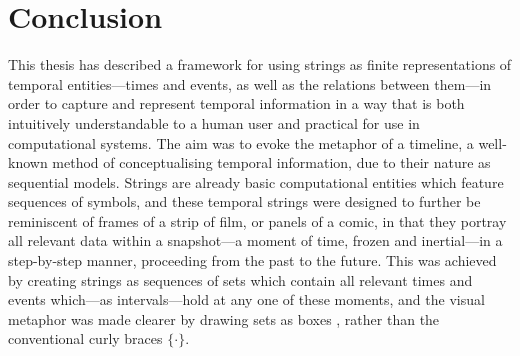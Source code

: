 \documentclass[a4paper,12pt,leqno,twoside]{article}
\newcommand{\vph}[1]{\vphantom{#1}}
\newcommand{\ebox}[1]{\fbox{$\vph{'(),}#1$}}
\begin{document}
\section{Conclusion}\label{sec:conclusion}
% 
% 
% 
% 
% 
This thesis has described a framework for using strings as finite representations of temporal entities---times and events, as well as the relations between them---in order to capture and represent temporal information in a way that is both intuitively understandable to a human user and practical for use in computational systems. The aim was to evoke the metaphor of a timeline, a well-known method of conceptualising temporal information, due to their nature as sequential models. Strings are already basic computational entities which feature sequences of symbols, and these temporal strings were designed to further be reminiscent of frames of a strip of film, or panels of a comic, in that they portray all relevant data within a snapshot---a moment of time, frozen and inertial---in a step-by-step manner, proceeding from the past to the future. This was achieved by creating strings as sequences of sets which contain all relevant times and events which---as intervals---hold at any one of these moments, and the visual metaphor was made clearer by drawing sets as boxes \ebox{\cdot}, rather than the conventional curly braces $\{\cdot\}$.
\end{document}
